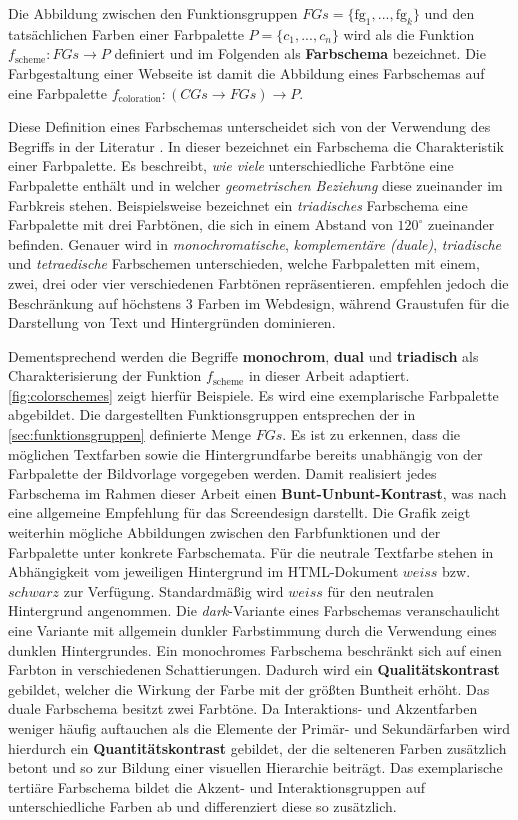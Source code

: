 Die Abbildung zwischen den Funktionsgruppen $FGs = \{\text{fg}_1, ... , \text{fg}_k\}$ und den tatsächlichen Farben einer Farbpalette $P = \{c_1, ... , c_n\}$ wird als die Funktion $f_\text{scheme}: FGs \to P$ definiert und im Folgenden als \textbf{Farbschema} bezeichnet. Die Farbgestaltung einer Webseite ist damit die Abbildung eines Farbschemas auf eine Farbpalette $f_\text{coloration}: (CGs \to FGs) \to P$.

Diese Definition eines Farbschemas unterscheidet sich von der Verwendung des Begriffs in der Literatur \citep{webdesign}. In dieser bezeichnet ein Farbschema die Charakteristik einer Farbpalette. Es beschreibt, \emph{wie viele} unterschiedliche Farbtöne eine Farbpalette enthält und in welcher \emph{geometrischen Beziehung} diese zueinander im Farbkreis stehen. Beispielsweise bezeichnet ein \emph{triadisches} Farbschema eine Farbpalette mit drei Farbtönen, die sich in einem Abstand von $120^{\circ}$ zueinander befinden. Genauer wird in  \emph{monochromatische}, \emph{komplementäre (duale)}, \emph{triadische} und \emph{tetraedische} Farbschemen unterschieden, welche Farbpaletten mit einem, zwei, drei oder vier verschiedenen Farbtönen repräsentieren. \citep{underestimated, smashing, google} empfehlen jedoch die Beschränkung auf höchstens 3 Farben im Webdesign, während Graustufen für die Darstellung von Text und Hintergründen dominieren.
    
Dementsprechend werden die Begriffe \textbf{monochrom}, \textbf{dual} und \textbf{triadisch} als Charakterisierung der Funktion $f_\text{scheme}$ in dieser Arbeit adaptiert. \autoref{fig:colorschemes} zeigt hierfür Beispiele. Es wird eine exemplarische Farbpalette abgebildet. Die dargestellten Funktionsgruppen entsprechen der in \autoref{sec:funktionsgruppen} definierte Menge $FGs$. Es ist zu erkennen, dass die möglichen Textfarben sowie die Hintergrundfarbe bereits unabhängig von der Farbpalette der Bildvorlage vorgegeben werden. Damit realisiert jedes Farbschema im Rahmen dieser Arbeit einen \textbf{Bunt-Unbunt-Kontrast}, was nach \citet{webx0} eine allgemeine Empfehlung für das Screendesign darstellt. Die Grafik zeigt weiterhin mögliche Abbildungen zwischen den Farbfunktionen und der Farbpalette unter \glqq{}konkrete Farbschemata\grqq{}. Für die neutrale Textfarbe stehen in Abhängigkeit vom jeweiligen Hintergrund im HTML-Dokument $weiss$ bzw. $schwarz$ zur Verfügung. Standardmäßig wird $weiss$ für den neutralen Hintergrund angenommen. Die \emph{dark}-Variante eines Farbschemas veranschaulicht eine Variante mit allgemein dunkler Farbstimmung durch die Verwendung eines dunklen Hintergrundes. Ein monochromes Farbschema beschränkt sich auf einen Farbton in verschiedenen Schattierungen. Dadurch wird ein \textbf{Qualitätskontrast} gebildet, welcher die Wirkung der Farbe mit der größten Buntheit erhöht. Das duale Farbschema besitzt zwei Farbtöne. Da Interaktions- und Akzentfarben weniger häufig auftauchen als die Elemente der Primär- und Sekundärfarben wird hierdurch ein \textbf{Quantitätskontrast} gebildet, der die selteneren Farben zusätzlich betont und so zur Bildung einer visuellen Hierarchie beiträgt. Das exemplarische tertiäre Farbschema bildet die Akzent- und Interaktionsgruppen auf unterschiedliche Farben ab und differenziert diese so zusätzlich. 

